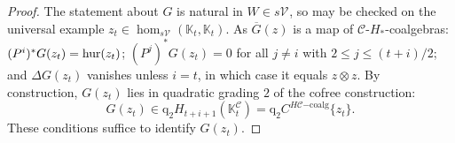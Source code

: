 \documentclass[11pt]{amsart} \renewcommand{\baselinestretch}{1.2}
\theoremstyle{plain}
\numberwithin{equation}{section} %
\theoremstyle{plain}
\numberwithin{equation}{chapter} %
\newcommand{\DASH}{\mathrm{-}}
\renewcommand{\to}{\longrightarrow}
\newcommand{\calV}{\mathcal{V}}
\newcommand{\calc}{\mathcal{C}}
\newcommand{\vect}[2]{\calV^{#1}_{#2}}
\newcommand{\HC}[1]{H#1\mathrm{-coalg}}
\newcommand{\quadgrad}[1]{\mathrm{q}_{#1}}
\renewcommand{\mapsto}{\longmapsto}
\begin{document}
\begin{Operations on the Bousfield-Kan spectral sequence}
\begin{proof}
The statement about $G$ is natural in $W\in s\vect{}{}$, so may be checked on the universal example $ z_t\in \hom_{s\vect{}{}}(\mathbb{K}_t,\mathbb{K}_t)$. As $\overline{G}( z)$ is a map of $\calc$-$H_*$-coalgebras: $(P^i)^*G( z_t)=\textup{hur}( z_t)$; $(P^j)^*G( z_t)=0$ for all $j\neq i$ with $2\leq j\leq (t+i)/2$; and $\Delta G( z_t)$ vanishes unless $i=t$, in which case it equals $ z\otimes  z$. By construction, $G( z_t)$ lies in quadratic grading $2$ of the cofree construction:
\[G( z_t)\in\quadgrad{2}H_{t+i+1}(\mathbb{K}^{\calc}_t)=\quadgrad{2}C^{\HC{\calc}}\{ z_t\}.\]
These conditions suffice to identify $G( z_t)$.
%
\end{proof}






\end{Operations on the Bousfield-Kan spectral sequence}
\end{document}

